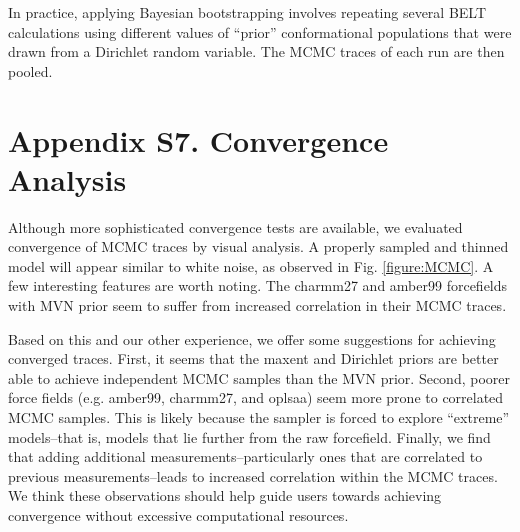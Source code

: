 \documentclass[12pt]{article}
\begin{document}
In practice, applying Bayesian bootstrapping involves repeating several BELT calculations using different values of ``prior'' conformational populations that were drawn from a Dirichlet random variable.  The MCMC traces of each run are then pooled.  

\newpage

\section*{Appendix S7.  Convergence Analysis}

Although more sophisticated convergence tests are available, we evaluated convergence of MCMC traces by visual analysis.  A properly sampled and thinned model will appear similar to white noise, as observed in Fig. \ref{figure:MCMC}.  A few interesting features are worth noting.  The charmm27 and amber99 forcefields with MVN prior seem to suffer from increased correlation in their MCMC traces.  

Based on this and our other experience, we offer some suggestions for achieving converged traces.  First, it seems that the maxent and Dirichlet priors are better able to achieve independent MCMC samples than the MVN prior.  Second, poorer force fields (e.g. amber99, charmm27, and oplsaa) seem more prone to correlated MCMC samples.  This is likely because the sampler is forced to explore ``extreme'' models--that is, models that lie further from the raw forcefield.  Finally, we find that adding additional measurements--particularly ones that are correlated to previous measurements--leads to increased correlation within the MCMC traces.  We think these observations should help guide users towards achieving convergence without excessive computational resources.  

\newpage



\end{document}
